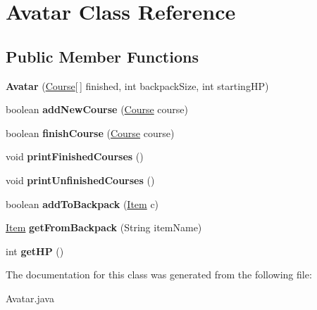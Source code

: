 \hypertarget{class_avatar}{}\section{Avatar Class Reference}
\label{class_avatar}
\subsection*{Public Member Functions}
\begin{DoxyCompactItemize}
\item 
\hypertarget{class_avatar_a1e169a41bf3a7d8f4bfbff5f141f325a}{}{\bfseries Avatar} (\hyperlink{class_course}{Course}\mbox{[}$\,$\mbox{]} finished, int backpack\+Size, int starting\+H\+P)\label{class_avatar_a1e169a41bf3a7d8f4bfbff5f141f325a}

\item 
\hypertarget{class_avatar_ac874154104cac8c626228fa00324136c}{}boolean {\bfseries add\+New\+Course} (\hyperlink{class_course}{Course} course)\label{class_avatar_ac874154104cac8c626228fa00324136c}

\item 
\hypertarget{class_avatar_a863cde0a614b62439592a4fdeb616456}{}boolean {\bfseries finish\+Course} (\hyperlink{class_course}{Course} course)\label{class_avatar_a863cde0a614b62439592a4fdeb616456}

\item 
\hypertarget{class_avatar_a677b7fba74b8d4092b2255efdb861c9a}{}void {\bfseries print\+Finished\+Courses} ()\label{class_avatar_a677b7fba74b8d4092b2255efdb861c9a}

\item 
\hypertarget{class_avatar_a3a1e90e2daef67f7a5bbdc0faf22639f}{}void {\bfseries print\+Unfinished\+Courses} ()\label{class_avatar_a3a1e90e2daef67f7a5bbdc0faf22639f}

\item 
\hypertarget{class_avatar_a52d8e9edc6db97535eb75ebc753ae418}{}boolean {\bfseries add\+To\+Backpack} (\hyperlink{class_item}{Item} c)\label{class_avatar_a52d8e9edc6db97535eb75ebc753ae418}

\item 
\hypertarget{class_avatar_a2fc1510fbc965e53bfe3e5f43f2ece5b}{}\hyperlink{class_item}{Item} {\bfseries get\+From\+Backpack} (String item\+Name)\label{class_avatar_a2fc1510fbc965e53bfe3e5f43f2ece5b}

\item 
\hypertarget{class_avatar_ae639c0e572b3430f319ef5145a33ec1d}{}int {\bfseries get\+H\+P} ()\label{class_avatar_ae639c0e572b3430f319ef5145a33ec1d}

\end{DoxyCompactItemize}


The documentation for this class was generated from the following file\+:\begin{DoxyCompactItemize}
\item 
Avatar.\+java\end{DoxyCompactItemize}
